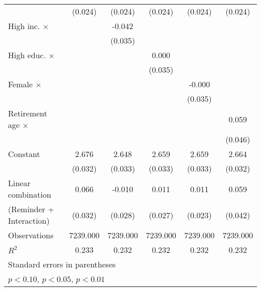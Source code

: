 {\begin{tabular}{l*{5}{c}}
                    &     (0.024)         &     (0.024)         &     (0.024)         &     (0.024)         &     (0.024)         \\
\addlinespace
High inc. $\times$  &                     &      -0.042         &                     &                     &                     \\
                    &                     &     (0.035)         &                     &                     &                     \\
\addlinespace
High educ. $\times$ &                     &                     &       0.000         &                     &                     \\
                    &                     &                     &     (0.035)         &                     &                     \\
\addlinespace
Female $\times$     &                     &                     &                     &      -0.000         &                     \\
                    &                     &                     &                     &     (0.035)         &                     \\
\addlinespace
Retirement age $\times$&                     &                     &                     &                     &       0.059         \\
                    &                     &                     &                     &                     &     (0.046)         \\
\addlinespace
Constant            &       2.676\sym{***}&       2.648\sym{***}&       2.659\sym{***}&       2.659\sym{***}&       2.664\sym{***}\\
                    &     (0.032)         &     (0.033)         &     (0.033)         &     (0.033)         &     (0.032)         \\
\midrule
Linear combination  &       0.066         &      -0.010         &       0.011         &       0.011         &       0.059         \\
(Reminder + Interaction)&     (0.032)         &     (0.028)         &     (0.027)         &     (0.023)         &     (0.042)         \\
Observations        &    7239.000         &    7239.000         &    7239.000         &    7239.000         &    7239.000         \\
\(R^{2}\)           &       0.233         &       0.232         &       0.232         &       0.232         &       0.232         \\
\bottomrule
\multicolumn{6}{l}{\footnotesize Standard errors in parentheses}\\
\multicolumn{6}{l}{\footnotesize \sym{*} \(p<0.10\), \sym{**} \(p<0.05\), \sym{***} \(p<0.01\)}\\
\end{tabular}
}
